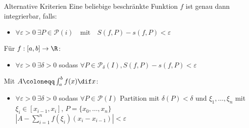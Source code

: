 \begin{theorem}{Alternative Kriterien}
    Eine beliebige beschränkte Funktion $f$ ist genau dann integrierbar, falls: 
    \begin{itemize}
         \item $\forall \varepsilon > 0 ~ \exists P \in \mathcal{P}(i) \quad \text{mit} \quad S(f,P) - s(f,P) < \varepsilon$
    \end{itemize}
    \vspace{2mm}
     Für $f : [a,b] \to \R$:
     \vspace{1mm}
     \begin{itemize}
         \item $\forall \varepsilon > 0 ~\exists \delta > 0$ sodass	
    $\forall P \in \mathcal{P}_\delta (I), S(f,P) - s(f,P) < \varepsilon$
     \end{itemize}
     \vspace{2mm}
    Mit $A \coloneqq \int_a^b f(x) \dif x$:
    \vspace{1mm}
    \begin{itemize}
        \item $\forall \varepsilon > 0 ~ \exists \delta > 0$ sodass $\forall P \in \mathcal{P} (I)$ Partition mit $\delta(P) < \delta$ und $\xi_1 , \ldots , \xi_n$ mit $\xi_i \in [x_{i-1},x_i]$, $P = \{x_0 , \ldots , x_n\}$\\ 
        $\left| A - \sum_{i=1}^n f(\xi_i) (x_i - x_{i-1})\right| < \varepsilon$
    \end{itemize}  
\end{theorem}


